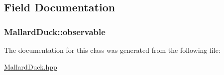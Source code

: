 \subsection{Field Documentation}
\hypertarget{classMallardDuck_ac0b2efc39c48e3fc850a7621d0f26a3a}{
\subsubsection[{observable}]{ Mallard\-Duck\-::observable}}\label{classMallardDuck_ac0b2efc39c48e3fc850a7621d0f26a3a}


The documentation for this class was generated from the following file\-:\begin{DoxyCompactItemize}
\item 
\hyperlink{MallardDuck_8hpp}{Mallard\-Duck.\-hpp}\end{DoxyCompactItemize}
